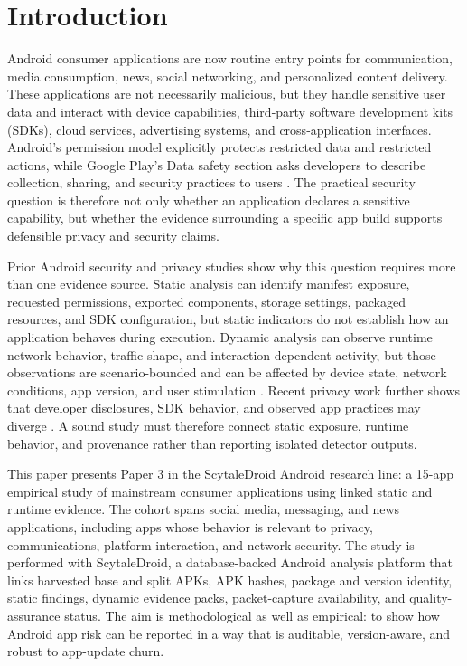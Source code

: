 \section{Introduction}

Android consumer applications are now routine entry points for communication, media consumption, news, social networking, and personalized content delivery. These applications are not necessarily malicious, but they handle sensitive user data and interact with device capabilities, third-party software development kits (SDKs), cloud services, advertising systems, and cross-application interfaces. Android's permission model explicitly protects restricted data and restricted actions, while Google Play's Data safety section asks developers to describe collection, sharing, and security practices to users \cite{androidPermissions2026,googlePlayDataSafety2026}. The practical security question is therefore not only whether an application declares a sensitive capability, but whether the evidence surrounding a specific app build supports defensible privacy and security claims.

Prior Android security and privacy studies show why this question requires more than one evidence source. Static analysis can identify manifest exposure, requested permissions, exported components, storage settings, packaged resources, and SDK configuration, but static indicators do not establish how an application behaves during execution. Dynamic analysis can observe runtime network behavior, traffic shape, and interaction-dependent activity, but those observations are scenario-bounded and can be affected by device state, network conditions, app version, and user stimulation \cite{yang2022maniscope,wang2023runtimepermissions,sutter2024dynamic}. Recent privacy work further shows that developer disclosures, SDK behavior, and observed app practices may diverge \cite{rodriguez2025privacysettings,khedkar2026privacydata}. A sound study must therefore connect static exposure, runtime behavior, and provenance rather than reporting isolated detector outputs.

This paper presents Paper 3 in the ScytaleDroid Android research line: a 15-app empirical study of mainstream consumer applications using linked static and runtime evidence. The cohort spans social media, messaging, and news applications, including apps whose behavior is relevant to privacy, communications, platform interaction, and network security. The study is performed with ScytaleDroid, a database-backed Android analysis platform that links harvested base and split APKs, APK hashes, package and version identity, static findings, dynamic evidence packs, packet-capture availability, and quality-assurance status. The aim is methodological as well as empirical: to show how Android app risk can be reported in a way that is auditable, version-aware, and robust to app-update churn.

